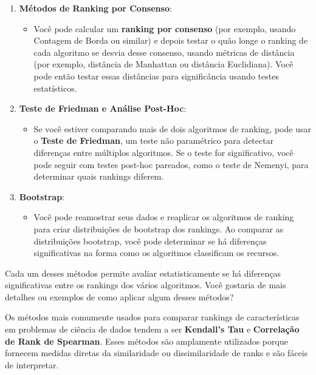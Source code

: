 \documentclass{article}
\begin{document}
\begin{enumerate}
    \item \textbf{Métodos de Ranking por Consenso}:  
    \begin{itemize}
        \item Você pode calcular um \textbf{ranking por consenso} (por exemplo, usando Contagem de Borda ou similar) e depois testar o quão longe o ranking de cada algoritmo se desvia desse consenso, usando métricas de distância (por exemplo, distância de Manhattan ou distância Euclidiana). Você pode então testar essas distâncias para significância usando testes estatísticos.
    \end{itemize}

    \item \textbf{Teste de Friedman e Análise Post-Hoc}:  
    \begin{itemize}
        \item Se você estiver comparando mais de dois algoritmos de ranking, pode usar o \textbf{Teste de Friedman}, um teste não paramétrico para detectar diferenças entre múltiplos algoritmos. Se o teste for significativo, você pode seguir com testes post-hoc pareados, como o teste de Nemenyi, para determinar quais rankings diferem.
    \end{itemize}

    \item \textbf{Bootstrap}:  
    \begin{itemize}
        \item Você pode reamostrar seus dados e reaplicar os algoritmos de ranking para criar distribuições de bootstrap dos rankings. Ao comparar as distribuições bootstrap, você pode determinar se há diferenças significativas na forma como os algoritmos classificam os recursos.
    \end{itemize}
\end{enumerate}

Cada um desses métodos permite avaliar estatisticamente se há diferenças significativas entre os rankings dos vários algoritmos. Você gostaria de mais detalhes ou exemplos de como aplicar algum desses métodos?

Os métodos mais comumente usados para comparar rankings de características em problemas de ciência de dados tendem a ser \textbf{Kendall's Tau} e \textbf{Correlação de Rank de Spearman}. Esses métodos são amplamente utilizados porque fornecem medidas diretas da similaridade ou dissimilaridade de ranks e são fáceis de interpretar.
\end{document}
